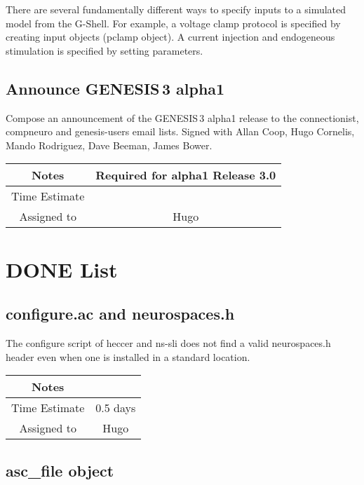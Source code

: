 \documentclass[12pt]{article}
\begin{document}
There are several fundamentally different ways to specify inputs to a
simulated model from the G-Shell.  For example, a voltage clamp
protocol is specified by creating input objects (pclamp object).  A
current injection and endogeneous stimulation is specified by setting
parameters.


\subsection{Announce GENESIS\,3 alpha1}

Compose an announcement of the GENESIS\,3 alpha1 release to the
connectionist, compneuro and genesis-users email lists.  Signed with
Allan Coop, Hugo Cornelis, Mando Rodriguez, Dave Beeman, James Bower.

{
  \vspace{5mm}
  \centering
  \begin{tabular}{|c|c|}
    \hline
    Notes
    & Required for alpha1 Release 3.0 \\
    \hline
    Time Estimate
    & \\
    \hline
    Assigned to
    & Hugo \\
    \hline
  \end{tabular}
}


\section{DONE List}

\subsection{configure.ac and neurospaces.h}

The configure script of heccer and ns-sli does not find a valid
neurospaces.h header even when one is installed in a standard
location.

{
  \vspace{5mm}
  \centering
  \begin{tabular}{|c|c|}
    \hline
    Notes
    & \\
    \hline
    Time Estimate
    & 0.5 days \\
    \hline
    Assigned to
    & Hugo \\
    \hline
  \end{tabular}
}


\subsection{asc\_file object}
\end{document}

